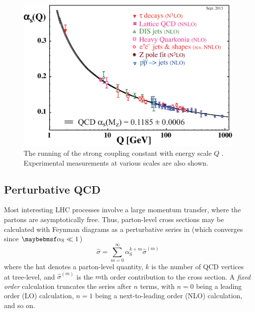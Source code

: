 \begin{figure}[t]
	\includegraphics[width=\mediumfigwidth]{tex/tools/alpha_s}
	\caption{The running of the strong coupling constant \alphaS with energy scale $Q$ 
	\cite{PDG:2012}. Experimental measurements at various scales are also shown.}
	\label{fig:qcd:alpha_s}
\end{figure}



\subsection{Perturbative QCD}
\label{sec:qcd:pqcd}

Most interesting LHC processes involve a large momentum transfer, where the partons 
are asymptotically free. Thus, parton-level cross sections may be calculated with Feynman 
diagrams as a perturbative series in \alphaS (which converges since $\alphaS \ll 1$)
\begin{equation}
	\hat{\sigma} = \sum\limits_{m=0}^{\infty} \alpha_{\text{S}}^{k+m} \hat{\sigma}^{(m)}
	\label{eq:qcd:partonic_xs}
\end{equation}
where the hat denotes a parton-level quantity, $k$ is the number of QCD vertices at 
tree-level, and $\hat{\sigma}^{(m)}$ is the $m$th order contribution to the cross section.
A \textit{fixed order} calculation truncates the series after $n$ terms, with $n=0$ being 
a leading order (LO) calculation, $n=1$ being a next-to-leading order (NLO) calculation, 
and so on.

